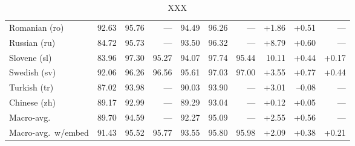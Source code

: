 \documentclass[11pt,letterpaper]{article}
\begin{document}
\begin{table}
\begin{tabular}{l|rrr|rrr|rrr}
Romanian (ro) & 92.63 & 95.76 & --- & 94.49 & 96.26 & --- & +1.86 & +0.51 & ---\\
Russian (ru) & 84.72 & 95.73 & --- & 93.50 & 96.32 & --- & +8.79 & +0.60 & ---\\
Slovene (sl) & 83.96 & 97.30 & 95.27 & 94.07 & 97.74 & 95.44 & 10.11 & +0.44 & +0.17\\
Swedish (sv) & 92.06 & 96.26 & 96.56 & 95.61 & 97.03 & 97.00 & +3.55 & +0.77 & +0.44\\
Turkish (tr) & 87.02 & 93.98 & --- & 90.03 & 93.90 & --- & +3.01 & --0.08 & ---\\
Chinese (zh) & 89.17 & 92.99 & --- & 89.29 & 93.04 & --- & +0.12 & +0.05 & ---\\
\midrule
Macro-avg. & 89.70 & 94.59 & --- & 92.27 & 95.09 & --- & +2.55 & +0.56 & ---\\
Macro-avg.~w/embed & 91.43 & 95.52 & 95.77 & 93.55 & 95.80 & 95.98 & +2.09 & +0.38 & +0.21\\
\end{tabular}
\caption{XXX}\label{tbl:results}
\end{table}






\end{document}

